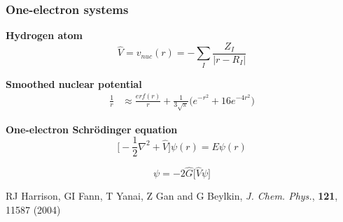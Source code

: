 \begin{frame}
    \frametitle{One-electron systems}
    \centering
    \textbf{Hydrogen atom}
    \begin{equation}
	\nonumber
	\hat{V} = v_{nuc}(r) = -\sum_I\frac{Z_I}{|r-R_I|}
    \end{equation}

    \vspace{5mm}

    \textbf{Smoothed nuclear potential}
    \begin{align}
	\nonumber
	\frac{1}{r} &\approx \frac{erf(r)}{r} +
	\frac{1}{3\sqrt{\pi}}\big(e^{-r^2}+16e^{-4r^2}\big)
    \end{align}

    \vspace{5mm}

    \textbf{One-electron Schr\"{o}dinger equation}
    \begin{equation}
        \nonumber
        \Big[-\frac{1}{2}\nabla^2 + \hat{V}\Big]\psi(r) = E \psi(r)
    \end{equation}

    \vspace{1mm}

    \begin{equation}
        \nonumber
        \psi = -2\hat{G} \Big[\hat{V} \psi \Big]
    \end{equation}

    \vspace{5mm}

    \centering
    \tiny
    RJ Harrison, GI Fann, T Yanai, Z Gan and G Beylkin,
    {\it J. Chem. Phys.}, 
    \textbf{121},
    11587 (2004)
\end{frame}

%
%
%
%
%
%
%


